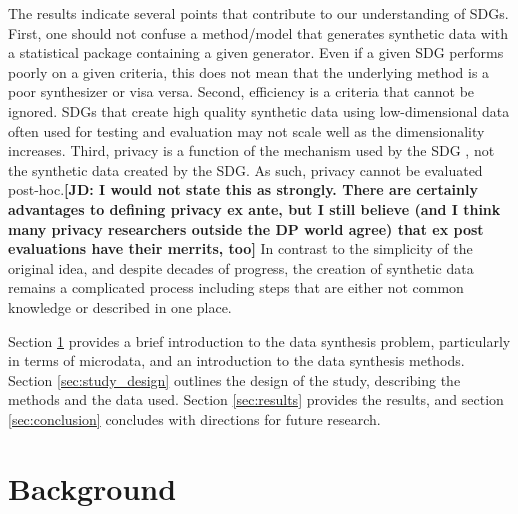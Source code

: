 \documentclass[runningheads]{llncs}
\newcommand{\jd}[1]{\scriptsize {\bf \color{red}[JD: #1]}\normalsize}
\begin{document}
The results indicate several points that contribute to our understanding of SDGs.  First, one should not confuse a method/model that generates synthetic data with a statistical package containing a given generator.  Even if a given SDG performs poorly on a given criteria, this does not mean that the underlying method is a poor synthesizer or visa versa.  Second, efficiency is a criteria that cannot be ignored.  SDGs that create high quality synthetic data using low-dimensional data often used for testing and evaluation may not scale well as the dimensionality increases.   Third, privacy is a function of the mechanism used by the SDG \cite{jordon2022synthetic}, not the synthetic data created by the SDG.  As such, privacy cannot be evaluated post-hoc.\jd{I would not state this as strongly. There are certainly advantages to defining privacy ex ante, but I still believe (and I think many privacy researchers outside the DP world agree) that ex post evaluations have their merrits, too}  In contrast to the simplicity of the original idea, and despite decades of progress, the creation of synthetic data remains a complicated process including steps that are either not common knowledge or described in one place.

Section \ref{sec:background} provides a brief introduction to the data synthesis problem, particularly in terms of microdata, and an introduction to the data synthesis methods. Section \ref{sec:study_design} outlines the design of the study, describing the methods and the data used. Section \ref{sec:results} provides the results, and section \ref{sec:conclusion} concludes with directions for future research.

\section{Background}\label{sec:background}
\end{document}
